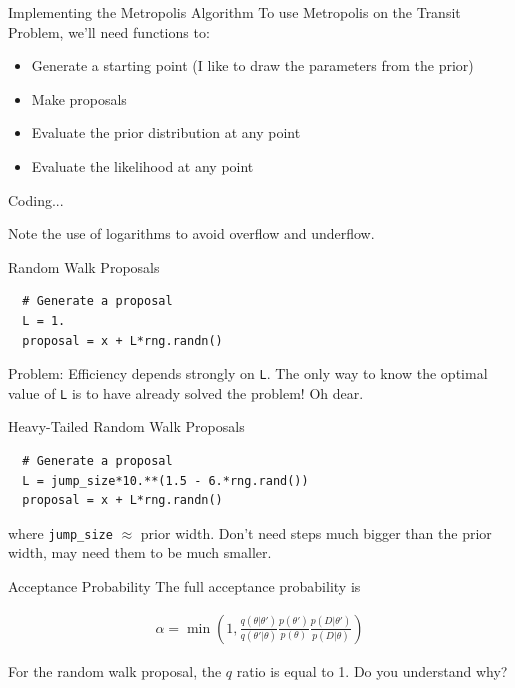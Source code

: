 \begin{frame}[t]{Implementing the Metropolis Algorithm}
To use Metropolis on the Transit Problem, we'll need functions to:
\begin{itemize}
\item Generate a starting point (I like to draw the parameters from the prior)
\item Make proposals
\item Evaluate the prior distribution at any point
\item Evaluate the likelihood at any point
\end{itemize}
\end{frame}

\begin{frame}[t]{}
Coding...

Note the use of logarithms to avoid overflow and underflow.
\end{frame}


\begin{frame}[t, fragile]{Random Walk Proposals}
\begin{verbatim}
  # Generate a proposal
  L = 1.
  proposal = x + L*rng.randn()
\end{verbatim}

Problem: Efficiency depends strongly on {\tt L}. The only way to know the
optimal value of {\tt L} is to have already solved the problem! Oh dear.
\end{frame}

\begin{frame}[t, fragile]{Heavy-Tailed Random Walk Proposals}
\begin{verbatim}
  # Generate a proposal
  L = jump_size*10.**(1.5 - 6.*rng.rand())
  proposal = x + L*rng.randn()
\end{verbatim}
where {\tt jump\_size} $\approx$ prior width.
Don't need steps much bigger than the prior width, may need them to be much
smaller.
\end{frame}


\begin{frame}[t]{Acceptance Probability}
The full acceptance probability is

\begin{eqnarray}
\alpha =
\min\left(1, \frac{q(\theta|\theta')}{q(\theta'|\theta)}\frac{p(\theta')}{p(\theta)}\frac{p(D|\theta')}{p(D|\theta)}\right)
\end{eqnarray}

For the random walk proposal, the $q$ ratio is equal to 1. Do you understand
why?
\end{frame}


